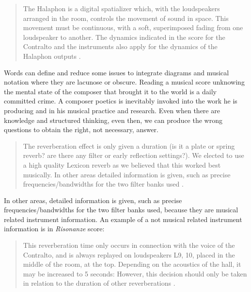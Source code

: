 \documentclass[twoside,a4paper]{article}
\begin{document}
\begin{quote}
The Halaphon is a digital spatializer which, with the loudspeakers arranged in the
room, controls the movement of sound in space. This movement must be continuous,
with a soft, superimposed fading from one loudspeaker to another. The dynamics
indicated in the score for the Contralto and the instruments also apply for the
dynamics of the Halaphon outputs \cite{nlre87}. %
\end{quote}

Words can define and reduce some issues to integrate diagrams and musical notation
where they are lacunose or obscure. Reading a musical score unknowing the mental
state of the composer that brought it to the world is a daily committed crime. A
composer poetics is inevitably invoked into the work he is producing and in his
musical practice and research. Even when there are knowledge and structured
thinking, even then, we can produce the wrong questions to obtain the right, not
necessary, answer.

\begin{quote}
The reverberation effect is only given a duration (is it a plate or spring reverb?
are there any filter or early reflection settings?). We elected to use a high
quality Lexicon reverb as we believed that this worked best musically. In other
areas detailed information is given, such as precise frequencies/bandwidths for
the two filter banks used \cite{rw05}.
\end{quote}

In other areas, detailed information is given, such as precise frequencies/bandwidths
for the two filter banks used, because they are musical related instrument
information. An example of a not musical related instrument information is in
\emph{Risonanze} score:

\begin{quote}
This reverberation time only occurs in connection with the voice of the Contralto,
and is always replayed on loudspeakers L9, 10, placed in the middle of the room,
at the top. Depending on the acoustics of the hall, it may be increased to 5
seconds: However, this decision should only be taken in relation to the duration
of other reverberations \cite{nlre87}.
\end{quote}
\end{document}

